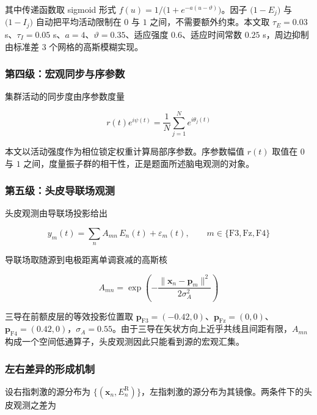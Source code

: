 \documentclass[bwprint]{gmcmthesis}
\begin{document}
其中传递函数取 sigmoid 形式 $f(u) = 1/\bigl(1+e^{-a(u-\vartheta)}\bigr)$。因子 $\bigl(1-E_j\bigr)$ 与 $\bigl(1-I_j\bigr)$ 自动把平均活动限制在 $0$ 与 $1$ 之间，不需要额外约束。本文取 $\tau_E = 0.03$ s、$\tau_I = 0.05$ s、$a = 4$、$\vartheta = 0.35$、适应强度 $0.6$、适应时间常数 $0.25$ s，周边抑制由标准差 $3$ 个网格的高斯模糊实现。

\subsubsection{第四级：宏观同步与序参数}

集群活动的同步度由序参数度量

\begin{equation}
r(t)e^{i\psi(t)} = \frac{1}{N}\sum_{j=1}^{N}e^{i\theta_j(t)}
\end{equation}

本文以活动强度作为相位锁定权重计算局部序参数。序参数幅值 $r(t)$ 取值在 $0$ 与 $1$ 之间，度量振子群的相干性，正是题面所述脑电观测的对象。

\subsubsection{第五级：头皮导联场观测}

头皮观测由导联场投影给出

\begin{equation}
y_m(t) = \sum_{n}A_{mn}\,E_n(t) + \varepsilon_m(t),\qquad m \in \{\mathrm{F3},\mathrm{Fz},\mathrm{F4}\}
\end{equation}

导联场取随源到电极距离单调衰减的高斯核

\begin{equation}
A_{mn} = \exp\!\left(-\frac{\lVert \mathbf{x}_n - \mathbf{p}_m\rVert^{2}}{2\sigma_A^{2}}\right)
\end{equation}

三导在前额皮层的等效投影位置取 $\mathbf{p}_{\mathrm{F3}} = (-0.42,0)$、$\mathbf{p}_{\mathrm{Fz}} = (0,0)$、$\mathbf{p}_{\mathrm{F4}} = (0.42,0)$，$\sigma_A = 0.55$。由于三导在矢状方向上近乎共线且间距有限，$A_{mn}$ 构成一个空间低通算子，头皮观测因此只能看到源的宏观汇集。

\subsubsection{左右差异的形成机制}

设右指刺激的源分布为 $\{(\mathbf{x}_n, E_n^{\mathrm{R}})\}$，左指刺激的源分布为其镜像。两条件下的头皮观测之差为
\end{document}

